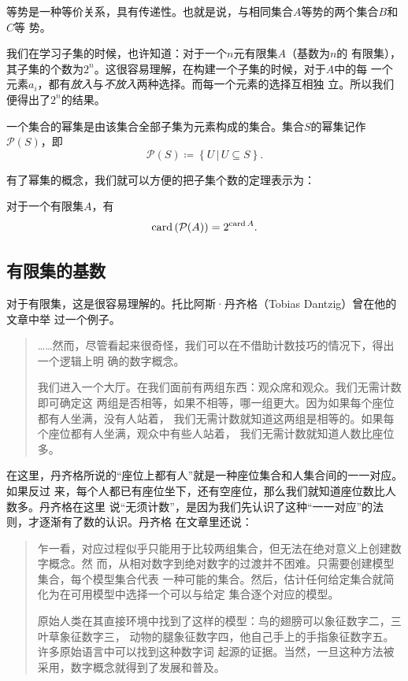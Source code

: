 等势是一种等价关系，具有传递性。也就是说，与相同集合$A$等势的两个集合$B$和$C$等
势。

我们在学习子集的时候，也许知道：对于一个$n$元有限集$A$（基数为$n$的
有限集），其子集的个数为$2^n$。这很容易理解，在构建一个子集的时候，对于$A$中的每
一个元素$a_i$，都有\emph{放入}与\emph{不放入}两种选择。而每一个元素的选择互相独
立。所以我们便得出了$2^n$的结果。

\begin{rawdef}[幂集]
    一个集合的幂集是由该集合全部子集为元素构成的集合。集合$S$的幂集记作
    $\mathcal{P}(S)$，即
    \[
        \mathcal{P}(S)\coloneqq \left\{ U \,|\, U \subseteq S \right\}.
    \]
\end{rawdef}

有了幂集的概念，我们就可以方便的把子集个数的定理表示为：
\begin{rawthm}
    对于一个有限集$A$，有
    \[
        \operatorname{card} \left( \mathcal{P}(A) \right) = 2^{\operatorname{card} A}.
    \]
\end{rawthm}


\subsection{有限集的基数}

对于有限集，这是很容易理解的。托比阿斯·丹齐格（Tobias Dantzig）曾在他的文章中举
过一个例子。\cite{dantzig2007number}

\begin{quotation}
    ……然而，尽管看起来很奇怪，我们可以在不借助计数技巧的情况下，得出一个逻辑上明
    确的数字概念。

    我们进入一个大厅。在我们面前有两组东西：观众席和观众。我们无需计数即可确定这
    两组是否相等，如果不相等，哪一组更大。因为如果每个座位都有人坐满，没有人站着，
    我们无需计数就知道这两组是相等的。如果每个座位都有人坐满，观众中有些人站着，
    我们无需计数就知道人数比座位多。
\end{quotation}

在这里，丹齐格所说的“座位上都有人”就是一种座位集合和人集合间的一一对应。如果反过
来，每个人都已有座位坐下，还有空座位，那么我们就知道座位数比人数多。丹齐格在这里
说“无须计数”，是因为我们先认识了这种“一一对应”的法则，才逐渐有了数的认识。丹齐格
在文章里还说：

\begin{quotation}
    乍一看，对应过程似乎只能用于比较两组集合，但无法在绝对意义上创建数字概念。然
    而，从相对数字到绝对数字的过渡并不困难。只需要创建模型集合，每个模型集合代表
    一种可能的集合。然后，估计任何给定集合就简化为在可用模型中选择一个可以与给定
    集合逐个对应的模型。

    原始人类在其直接环境中找到了这样的模型：鸟的翅膀可以象征数字二，三叶草象征数字三，
    动物的腿象征数字四，他自己手上的手指象征数字五。许多原始语言中可以找到这种数字词
    起源的证据。当然，一旦这种方法被采用，数字概念就得到了发展和普及。
\end{quotation}

